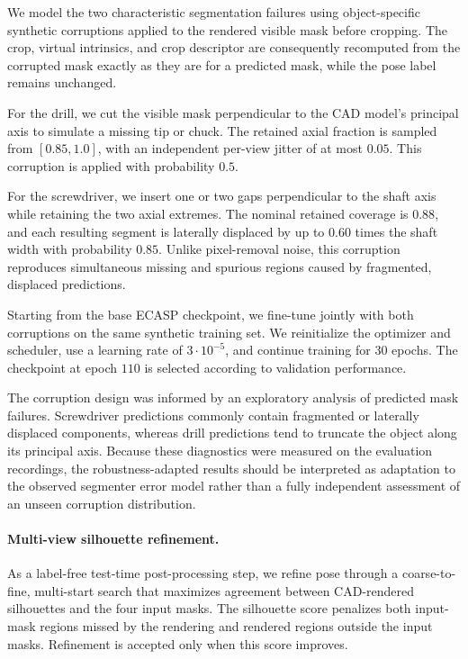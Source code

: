
\label{supp:mask_robust_finetuning}

We model the two characteristic segmentation failures using object-specific
synthetic corruptions applied to the rendered visible mask before cropping.
The crop, virtual intrinsics, and crop descriptor are consequently recomputed
from the corrupted mask exactly as they are for a predicted mask, while the
pose label remains unchanged.

For the drill, we cut the visible mask perpendicular to the CAD model's
principal axis to simulate a missing tip or chuck.
The retained axial fraction is sampled from \([0.85,1.0]\), with an
independent per-view jitter of at most \(0.05\).
This corruption is applied with probability \(0.5\).

For the screwdriver, we insert one or two gaps perpendicular to the shaft
axis while retaining the two axial extremes.
The nominal retained coverage is \(0.88\), and each resulting segment is
laterally displaced by up to \(0.60\) times the shaft width with probability
\(0.85\).
Unlike pixel-removal noise, this corruption reproduces simultaneous missing
and spurious regions caused by fragmented, displaced predictions.

Starting from the base ECASP checkpoint, we fine-tune jointly with both
corruptions on the same synthetic training set.
We reinitialize the optimizer and scheduler, use a learning rate of
\(3\cdot10^{-5}\), and continue training for \(30\) epochs.
The checkpoint at epoch \(110\) is selected according to validation
performance.

The corruption design was informed by an exploratory analysis of predicted
mask failures.
Screwdriver predictions commonly contain fragmented or laterally displaced
components, whereas drill predictions tend to truncate the object along its
principal axis.
Because these diagnostics were measured on the evaluation recordings, the
robustness-adapted results should be interpreted as adaptation to the
observed segmenter error model rather than a fully independent assessment of
an unseen corruption distribution.

\paragraph{Multi-view silhouette refinement.}
As a label-free test-time post-processing step, we refine pose through a coarse-to-fine, multi-start search that maximizes agreement between CAD-rendered silhouettes and the four input masks.
The silhouette score penalizes both input-mask regions missed by the rendering and rendered regions outside the input masks. Refinement is accepted only when this score improves.

